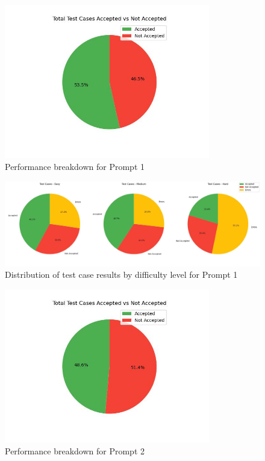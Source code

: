 \begin{figure}[H]
    \centering
    \includegraphics[width=0.8\textwidth]{figures/1/total_accepted_not.jpg}
    \caption{Performance breakdown for Prompt 1}
    \label{fig:prompt1_performance}
\end{figure}

\begin{figure}[H]
    \centering
    \includegraphics[width=1\textwidth]{figures/1/pie_difficulty.jpg}
    \caption{Distribution of test case results by difficulty level for Prompt 1}
    \label{fig:prompt1_difficulty}
\end{figure}

\begin{figure}[H]
    \centering
    \includegraphics[width=0.8\textwidth]{figures/2/total_accepted_not.jpg}
    \caption{Performance breakdown for Prompt 2}
    \label{fig:prompt2_performance}
\end{figure}

